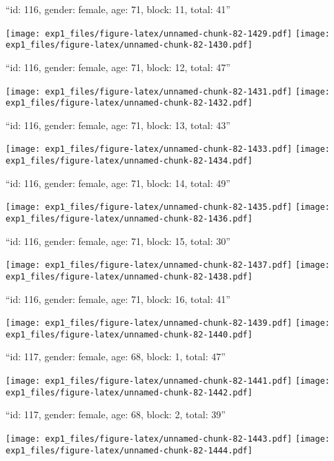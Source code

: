 \documentclass[11pt,,]{article}
\begin{document}
\newpage
[1] 

``id: 116, gender: female, age: 71, block: 11, total: 41''

\texttt{[image: exp1\_files/figure-latex/unnamed-chunk-82-1429.pdf]}
\texttt{[image: exp1\_files/figure-latex/unnamed-chunk-82-1430.pdf]}

\newpage
[1] 

``id: 116, gender: female, age: 71, block: 12, total: 47''

\texttt{[image: exp1\_files/figure-latex/unnamed-chunk-82-1431.pdf]}
\texttt{[image: exp1\_files/figure-latex/unnamed-chunk-82-1432.pdf]}

\newpage
[1] 

``id: 116, gender: female, age: 71, block: 13, total: 43''

\texttt{[image: exp1\_files/figure-latex/unnamed-chunk-82-1433.pdf]}
\texttt{[image: exp1\_files/figure-latex/unnamed-chunk-82-1434.pdf]}

\newpage
[1] 

``id: 116, gender: female, age: 71, block: 14, total: 49''

\texttt{[image: exp1\_files/figure-latex/unnamed-chunk-82-1435.pdf]}
\texttt{[image: exp1\_files/figure-latex/unnamed-chunk-82-1436.pdf]}

\newpage
[1] 

``id: 116, gender: female, age: 71, block: 15, total: 30''

\texttt{[image: exp1\_files/figure-latex/unnamed-chunk-82-1437.pdf]}
\texttt{[image: exp1\_files/figure-latex/unnamed-chunk-82-1438.pdf]}

\newpage
[1] 

``id: 116, gender: female, age: 71, block: 16, total: 41''

\texttt{[image: exp1\_files/figure-latex/unnamed-chunk-82-1439.pdf]}
\texttt{[image: exp1\_files/figure-latex/unnamed-chunk-82-1440.pdf]}

\newpage
[1] 

``id: 117, gender: female, age: 68, block: 1, total: 47''

\texttt{[image: exp1\_files/figure-latex/unnamed-chunk-82-1441.pdf]}
\texttt{[image: exp1\_files/figure-latex/unnamed-chunk-82-1442.pdf]}

\newpage
[1] 

``id: 117, gender: female, age: 68, block: 2, total: 39''

\texttt{[image: exp1\_files/figure-latex/unnamed-chunk-82-1443.pdf]}
\texttt{[image: exp1\_files/figure-latex/unnamed-chunk-82-1444.pdf]}
\end{document}
